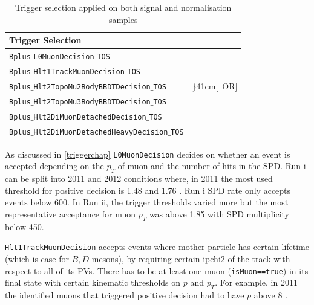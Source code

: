 \begin{table}[h!]
\begin{center}
	\begin{tabular}{ l l}%
Trigger Selection  \\ %
\hline
		\texttt{Bplus$\_$L0MuonDecision$\_$TOS} \\ %
\hline
		\texttt{Bplus$\_$Hlt1TrackMuonDecision$\_$TOS} \\%
\hline
		\texttt{Bplus$\_$Hlt2TopoMu2BodyBBDTDecision$\_$TOS} & \rdelim\}{4}{1cm}[\ OR]\\ %
		\texttt{Bplus$\_$Hlt2TopoMu3BodyBBDTDecision$\_$TOS} \\ %
		\texttt{Bplus$\_$Hlt2DiMuonDetachedDecision$\_$TOS} \\ %
		\texttt{Bplus$\_$Hlt2DiMuonDetachedHeavyDecision$\_$TOS} \\ %
\hline
\end{tabular}
\end{center}
	\caption{Trigger selection applied on both signal and normalisation samples}
	\label{tab:triggersel}
\end{table}

As discussed in \autoref{triggerchap} \texttt{L0MuonDecision} decides on whether an event is accepted depending on the $p_{T}$ of muon and the number of hits in the \gls{SPD}. Run \Rn{1} can be split into 2011 and 2012 conditions where, in 2011 the most used threshold for positive decision is 1.48 \gevc \cite{Aaij:2012me} and 1.76 \gevc \cite{Albrecht:2013fba}. Run \Rn{1} \gls{SPD} rate only accepts events below 600. In Run \Rn{2}, the trigger thresholds varied more but the most representative acceptance for muon $p_{T}$ was above 1.85 \gevc with \gls{SPD} multiplicity below 450.

\texttt{Hlt1TrackMuonDecision} accepts events where mother particle has certain lifetime (which is case for $B,D$ mesons), by requiring certain \gls{ipchi2} of the track with respect to all of its \gls{PV}s. There has to be at least one muon (\texttt{isMuon==true}) in its final state with certain kinematic thresholds on $p$ and $p_{T}$. For example, in 2011 the identified muons that triggered positive decision had to have $p$ above 8 \gevc \cite{Aaij:2012me}.

